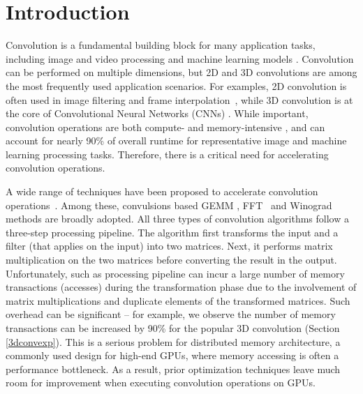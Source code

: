 \section{Introduction}
Convolution is a fundamental building block for many application tasks, including image and video processing and machine learning
models \cite{Perrot2014Fine,Ma2014Optimized,Rudi2015Image,Niklaus2017Video,Krizhevsky2012ImageNet,SimonyanZ14a,HeZRS16,SzegedyLJSRAEVR15}. Convolution can be performed on multiple dimensions, but 2D and 3D convolutions are among the most frequently used
application scenarios. For examples, 2D convolution is often used in image filtering and frame
interpolation~\cite{Perrot2014Fine,Ma2014Optimized,Rudi2015Image,Niklaus2017Video}, while 3D convolution is at the core of Convolutional
Neural Networks (CNNs) \cite{Krizhevsky2012ImageNet,SimonyanZ14a,HeZRS16,SzegedyLJSRAEVR15}. While important, convolution operations are both compute- and memory-intensive \cite{cavigelli2015accelerating},
and can account for nearly 90\% of overall runtime \cite{Li2016Performance} for representative image and machine learning processing tasks.
Therefore, there is a critical need for accelerating convolution operations.


A wide range of techniques have been proposed to accelerate convolution
operations~\cite{Iandola2014Communication,vasilache2014fast,lavin2016fast,cho2017mec,Zhen2018Optimizing,Vasudevan2017Parallel,Chellapilla2006High}.
Among these, convulsions based GEMM \cite{Vasudevan2017Parallel,Chellapilla2006High}, FFT~\cite{vasilache2014fast} and
Winograd~\cite{lavin2016fast} methods are broadly adopted. All three types of convolution algorithms follow a
three-step processing pipeline. The algorithm first transforms the input and a filter (that applies on the input) into
two matrices. Next, it performs matrix multiplication on the two matrices before converting the result in the output.
Unfortunately, such as processing pipeline can incur a large number of memory transactions (accesses) during the
transformation phase due to the involvement of matrix multiplications and duplicate elements of the transformed
matrices. Such overhead can be significant – for example, we observe the number of memory transactions can be increased
by 90\% for the popular 3D convolution (Section \ref{3dconvexp}). This is a serious problem for distributed memory
architecture, a commonly used design for high-end GPUs, where memory accessing is often a performance bottleneck. As a
result, prior optimization techniques leave much room for improvement when executing convolution operations on GPUs.


